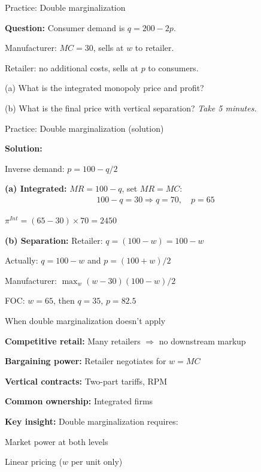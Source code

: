 \documentclass[notes,11pt, aspectratio=169]{beamer}
\newenvironment{wideitemize}{\itemize\addtolength{\itemsep}{10pt}}{\enditemize}
\newenvironment{wideenumerate}{\enumerate\addtolength{\itemsep}{10pt}}{\endenumerate}
\begin{document}
\begin{frame}{Practice: Double marginalization}
	\begin{wideitemize}
		\item \textbf{Question:} Consumer demand is $q = 200 - 2p$.
		\item Manufacturer: $MC = 30$, sells at $w$ to retailer.
		\item Retailer: no additional costs, sells at $p$ to consumers.
		\item (a) What is the integrated monopoly price and profit?
		\item (b) What is the final price with vertical separation?
	\end{wideitemize}
	\vspace{10pt}
	\centering
	\textit{Take 5 minutes.}
\end{frame}

\begin{frame}{Practice: Double marginalization (solution)}
	\begin{wideitemize}
		\item \textbf{Solution:}
		\item Inverse demand: $p = 100 - q/2$
		\item \textbf{(a) Integrated:} $MR = 100 - q$, set $MR = MC$:
		\begin{align*}
			100 - q = 30 \Rightarrow q = 70, \quad p = 65
		\end{align*}
		\item $\pi^{Int} = (65-30) \times 70 = 2450$
		\item \textbf{(b) Separation:} Retailer: $q = (100-w) = 100-w$
		\item Actually: $q = 100 - w$ and $p = (100+w)/2$
		\item Manufacturer: $\max_w (w-30)(100-w)/2$
		\item FOC: $w = 65$, then $q = 35$, $p = 82.5$
	\end{wideitemize}
\end{frame}

\begin{frame}{When double marginalization doesn't apply}
	\begin{wideitemize}
		\item \textbf{Competitive retail:} Many retailers $\Rightarrow$ no downstream markup
		\item \textbf{Bargaining power:} Retailer negotiates for $w = MC$
		\item \textbf{Vertical contracts:} Two-part tariffs, RPM
		\item \textbf{Common ownership:} Integrated firms
		\item \textbf{Key insight:} Double marginalization requires:
		\begin{wideenumerate}
			\vspace{5pt}
			\item Market power at both levels
			\item Linear pricing ($w$ per unit only)
		\end{wideenumerate}
	\end{wideitemize}
\end{frame}
\end{document}
